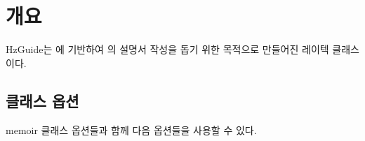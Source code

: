 \documentclass[minted]{hzguide}
\begin{document}
\mainmatter*

\chapter{개요}

HzGuide는 에 기반하여 의 설명서 작성을 돕기 위한 목적으로 만들어진 레이텍 클래스이다.

\section{클래스 옵션}

memoir 클래스 옵션들과 함께 다음 옵션들을 사용할 수 있다.

\end{document}
